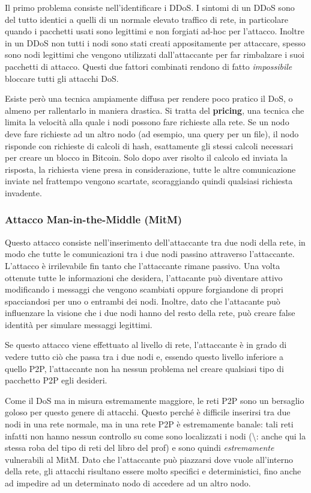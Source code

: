 Il primo problema consiste nell'identificare i DDoS. I sintomi di un
DDoS sono del tutto identici a quelli di un normale elevato traffico di
rete, in particolare quando i pacchetti usati sono legittimi e non
forgiati ad-hoc per l'attacco. Inoltre in un DDoS non tutti i nodi sono
stati creati appositamente per attaccare, spesso sono nodi legittimi che
vengono utilizzati dall'attaccante per far rimbalzare i suoi pacchetti
di attacco. Questi due fattori combinati rendono di fatto
\emph{impossibile} bloccare tutti gli attacchi DoS.

Esiste però una tecnica ampiamente diffusa per rendere poco pratico il
DoS, o almeno per rallentarlo in maniera drastica. Si tratta del
\textbf{pricing}, una tecnica che limita la velocità alla quale i nodi
possono fare richieste alla rete. Se un nodo deve fare richieste ad un
altro nodo (ad esempio, una query per un file), il nodo risponde con
richieste di calcoli di hash, esattamente gli stessi calcoli necessari
per creare un blocco in Bitcoin. Solo dopo aver risolto il calcolo ed
inviata la risposta, la richiesta viene presa in considerazione, tutte
le altre comunicazione inviate nel frattempo vengono scartate,
scoraggiando quindi qualsiasi richiesta invadente.

\subsubsection{Attacco Man-in-the-Middle
(MitM)}\label{attacco-man-in-the-middle-mitm}

Questo attacco consiste nell'inserimento dell'attaccante tra due nodi
della rete, in modo che tutte le comunicazioni tra i due nodi passino
attraverso l'attaccante. L'attacco è irrilevabile fin tanto che
l'attaccante rimane passivo. Una volta ottenute tutte le informazioni
che desidera, l'attacante può diventare attivo modificando i messaggi
che vengono scambiati oppure forgiandone di propri spacciandosi per uno
o entrambi dei nodi. Inoltre, dato che l'attacante può influenzare la
visione che i due nodi hanno del resto della rete, può creare false
identità per simulare messaggi legittimi.

Se questo attacco viene effettuato al livello di rete, l'attaccante è in
grado di vedere tutto ciò che passa tra i due nodi e, essendo questo
livello inferiore a quello P2P, l'attaccante non ha nessun problema nel
creare qualsiasi tipo di pacchetto P2P egli desideri.

Come il DoS ma in misura estremamente maggiore, le reti P2P sono un
bersaglio goloso per questo genere di attacchi. Questo perché è
difficile inserirsi tra due nodi in una rete normale, ma in una rete P2P
è estremamente banale: tali reti infatti non hanno nessun controllo su
come sono localizzati i nodi (\textbackslash{}\TODO: anche qui la stessa
roba del tipo di reti del libro del prof) e sono quindi
\emph{estremamente} vulnerabili al MitM. Dato che l'attaccante può
piazzarsi dove vuole all'interno della rete, gli attacchi risultano
essere molto specifici e deterministici, fino anche ad impedire ad un
determinato nodo di accedere ad un altro nodo.

